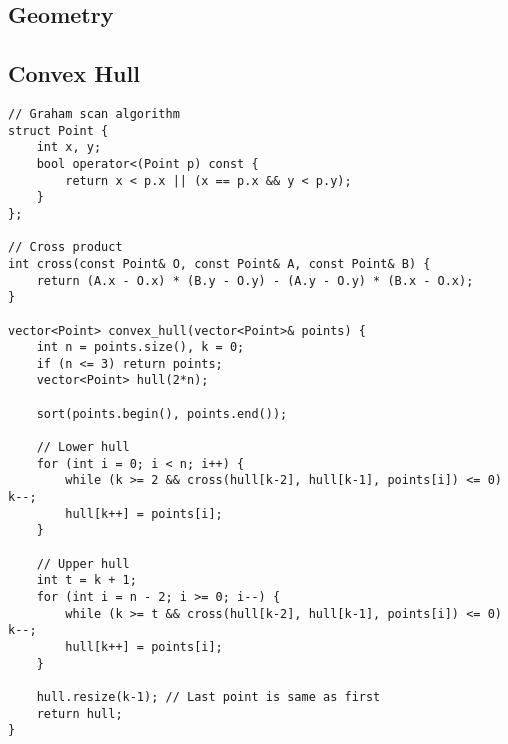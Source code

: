 \documentclass[10pt]{article}
\begin{document}
\begin{landscape}
\begin{multicols}{2}
\section{Geometry}
\subsection{Convex Hull}
\begin{lstlisting}[style=cpp]
// Graham scan algorithm
struct Point {
    int x, y;
    bool operator<(Point p) const {
        return x < p.x || (x == p.x && y < p.y);
    }
};

// Cross product
int cross(const Point& O, const Point& A, const Point& B) {
    return (A.x - O.x) * (B.y - O.y) - (A.y - O.y) * (B.x - O.x);
}

vector<Point> convex_hull(vector<Point>& points) {
    int n = points.size(), k = 0;
    if (n <= 3) return points;
    vector<Point> hull(2*n);
    
    sort(points.begin(), points.end());
    
    // Lower hull
    for (int i = 0; i < n; i++) {
        while (k >= 2 && cross(hull[k-2], hull[k-1], points[i]) <= 0) k--;
        hull[k++] = points[i];
    }
    
    // Upper hull
    int t = k + 1;
    for (int i = n - 2; i >= 0; i--) {
        while (k >= t && cross(hull[k-2], hull[k-1], points[i]) <= 0) k--;
        hull[k++] = points[i];
    }
    
    hull.resize(k-1); // Last point is same as first
    return hull;
}
\end{lstlisting}

\end{multicols}
\end{landscape}

\end{document}
